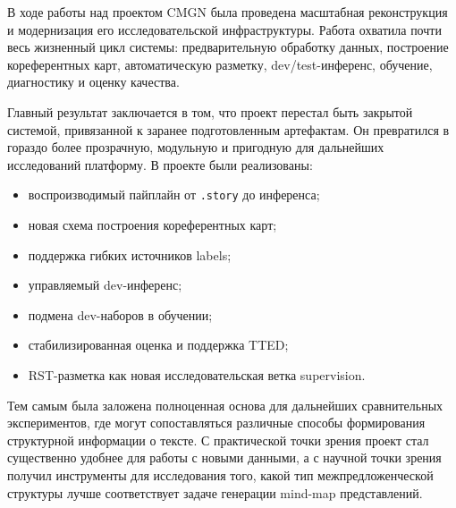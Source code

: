 \documentclass[12pt,a4paper]{article}
\begin{document}
В ходе работы над проектом CMGN была проведена масштабная реконструкция и модернизация
его исследовательской инфраструктуры. Работа охватила почти весь жизненный цикл системы:
предварительную обработку данных, построение кореферентных карт, автоматическую разметку,
dev/test-инференс, обучение, диагностику и оценку качества.

Главный результат заключается в том, что проект перестал быть закрытой системой,
привязанной к заранее подготовленным артефактам. Он превратился в гораздо более
прозрачную, модульную и пригодную для дальнейших исследований платформу. В проекте были
реализованы:

\begin{itemize}
    \item воспроизводимый пайплайн от \texttt{.story} до инференса;
    \item новая схема построения кореферентных карт;
    \item поддержка гибких источников labels;
    \item управляемый dev-инференс;
    \item подмена dev-наборов в обучении;
    \item стабилизированная оценка и поддержка TTED;
    \item RST-разметка как новая исследовательская ветка supervision.
\end{itemize}

Тем самым была заложена полноценная основа для дальнейших сравнительных экспериментов,
где могут сопоставляться различные способы формирования структурной информации о тексте.
С практической точки зрения проект стал существенно удобнее для работы с новыми данными,
а с научной точки зрения получил инструменты для исследования того, какой тип
межпредложенческой структуры лучше соответствует задаче генерации mind-map представлений.
\end{document}
